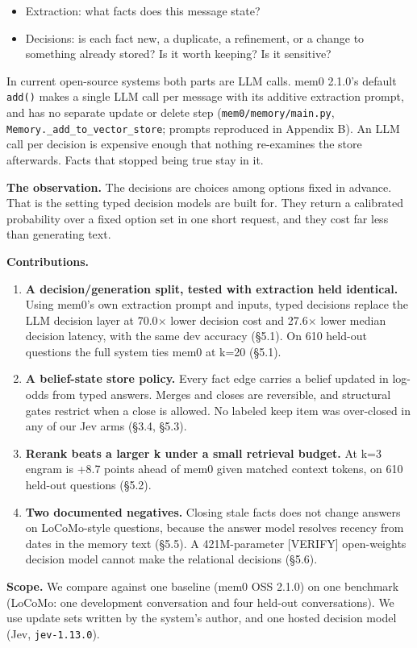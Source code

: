 \documentclass[11pt]{article}
\newcommand{\src}[1]{}
\begin{document}
\begin{itemize}
\item Extraction: what facts does this message state?
\item Decisions: is each fact new, a duplicate, a refinement, or a change to something already stored? Is it worth keeping? Is it sensitive?
\end{itemize}
In current open-source systems both parts are LLM calls. mem0 2.1.0's default \texttt{add()} makes a single LLM call per message with its additive extraction prompt, and has no separate update or delete step (\texttt{mem0/memory/main.py}, \texttt{Memory.\_\allowbreak{}add\_\allowbreak{}to\_\allowbreak{}vector\_\allowbreak{}store}; prompts reproduced in Appendix B). An LLM call per decision is expensive enough that nothing re-examines the store afterwards. Facts that stopped being true stay in it.

\textbf{The observation.} The decisions are choices among options fixed in advance. That is the setting typed decision models are built for. They return a calibrated probability over a fixed option set in one short request, and they cost far less than generating text.

\textbf{Contributions.}

\begin{enumerate}
\item \textbf{A decision/generation split, tested with extraction held identical.} Using mem0's own extraction prompt and inputs, typed decisions replace the LLM decision layer at 70.0$\times$\src{bench/results/e2_llm__dev.json ÷ bench/results/e2_jev__dev.json} lower decision cost and 27.6$\times$\src{bench/results/e2_llm__dev.json ÷ bench/results/e2_jev__dev.json} lower median decision latency, with the same dev accuracy (\S{}5.1). On 610\src{bench/results/heldout_report.json} held-out questions the full system ties mem0 at k=20 (\S{}5.1).
\item \textbf{A belief-state store policy.} Every fact edge carries a belief updated in log-odds from typed answers. Merges and closes are reversible, and structural gates restrict when a close is allowed. No labeled keep item was over-closed in any of our Jev arms (\S{}3.4, \S{}5.3).
\item \textbf{Rerank beats a larger k under a small retrieval budget.} At k=3 engram is +8.7\src{bench/results/mem0_token_matched__heldout_pooled__k6.json} points ahead of mem0 given matched context tokens, on 610\src{bench/results/heldout_report.json} held-out questions (\S{}5.2).
\item \textbf{Two documented negatives.} Closing stale facts does not change answers on LoCoMo-style questions, because the answer model resolves recency from dates in the memory text (\S{}5.5). A 421M-parameter [VERIFY] open-weights decision model cannot make the relational decisions (\S{}5.6).
\end{enumerate}
\textbf{Scope.} We compare against one baseline (mem0 OSS 2.1.0) on one benchmark (LoCoMo: one development conversation and four held-out conversations). We use update sets written by the system's author, and one hosted decision model (Jev, \texttt{jev-1.13.0}).
\end{document}
